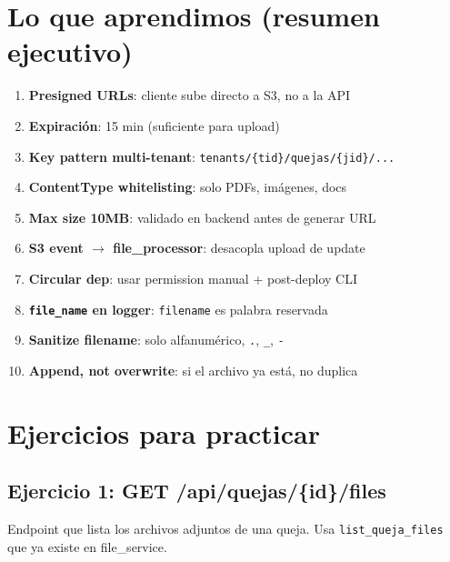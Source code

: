 \documentclass[11pt,a4paper,oneside]{article}
\begin{document}
\section{Lo que aprendimos (resumen ejecutivo)}

\begin{tcolorbox}[colback=okgreen!5!white,colframe=okgreen,title={\textbf{Checklist Fase 4}}]
\begin{enumerate}
  \item \textbf{Presigned URLs}: cliente sube directo a S3, no a la API
  \item \textbf{Expiraci\'on}: 15 min (suficiente para upload)
  \item \textbf{Key pattern multi-tenant}: \texttt{tenants/\{tid\}/quejas/\{jid\}/...}
  \item \textbf{ContentType whitelisting}: solo PDFs, im\'agenes, docs
  \item \textbf{Max size 10MB}: validado en backend antes de generar URL
  \item \textbf{S3 event $\rightarrow$ file\_processor}: desacopla upload de update
  \item \textbf{Circular dep}: usar permission manual + post-deploy CLI
  \item \textbf{\texttt{file\_name} en logger}: \texttt{filename} es palabra reservada
  \item \textbf{Sanitize filename}: solo alfanum\'erico, \texttt{.}, \texttt{\_}, \texttt{-}
  \item \textbf{Append, not overwrite}: si el archivo ya est\'a, no duplica
\end{enumerate}
\end{tcolorbox}

\section{Ejercicios para practicar}

\subsection{Ejercicio 1: GET /api/quejas/\{id\}/files}

Endpoint que lista los archivos adjuntos de una queja. Usa \texttt{list\_queja\_files} que ya existe en file\_service.
\end{document}
